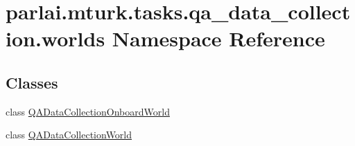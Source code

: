 \hypertarget{namespaceparlai_1_1mturk_1_1tasks_1_1qa__data__collection_1_1worlds}{}\section{parlai.\+mturk.\+tasks.\+qa\+\_\+data\+\_\+collection.\+worlds Namespace Reference}
\label{namespaceparlai_1_1mturk_1_1tasks_1_1qa__data__collection_1_1worlds}
\subsection*{Classes}
\begin{DoxyCompactItemize}
\item 
class \hyperlink{classparlai_1_1mturk_1_1tasks_1_1qa__data__collection_1_1worlds_1_1QADataCollectionOnboardWorld}{Q\+A\+Data\+Collection\+Onboard\+World}
\item 
class \hyperlink{classparlai_1_1mturk_1_1tasks_1_1qa__data__collection_1_1worlds_1_1QADataCollectionWorld}{Q\+A\+Data\+Collection\+World}
\end{DoxyCompactItemize}
